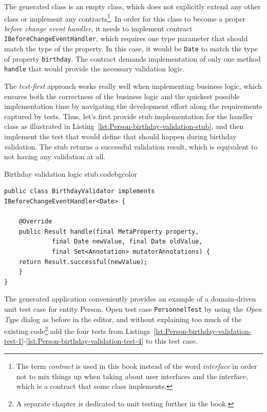   The generated class is an empty class, which does not explicitly extend any other class or implement any contracts\footnote{The term \emph{contract} is used in this book instead of the word \emph{interface} in order not to mix things up when taking about user interfaces and the interface, which is a contract that some class implements.}.
  In order for this class to become a proper \emph{before change event handler}, it needs to implement contract \texttt{IBeforeChangeEventHandler}, which requires one type parameter that should match the type of the property.
  In this case, it would be \texttt{Date} to match the type of property \texttt{birthday}.
  The contract demands implementation of only one method \texttt{handle} that would provide the necessary validation logic.
  
  The \emph{test-first} approach works really well when implementing business logic, which ensures both the correctness of the business logic and the quickest possible implementation time by navigating the development effort along the requirements captured by tests.
  Thus, let's first provide stub implementation for the handler class as illustrated in Listing~\ref{lst:Person-birthday-validation-stub}, and then implement the test that would define that should happen during birthday validation.  
  The stub returns a successful validation result, which is equivalent to not having any validation at all.
  
 \begin{code}{Birthday validation logic stub.}{\label{lst:Person-birthday-validation-stub}}{codebgcolor}
    \begin{lstlisting}
public class BirthdayValidator implements IBeforeChangeEventHandler<Date> {

    @Override
    public Result handle(final MetaProperty property, 
			 final Date newValue, final Date oldValue, 
			 final Set<Annotation> mutatorAnnotations) {
	return Result.successful(newValue);
    }
}
    \end{lstlisting}
  \end{code}
  
  The generated application conveniently provides an example of a domain-driven unit test case for entity Person.
  Open test case \texttt{PersonnelTest} by using the \emph{Open Type} dialog as before in the editor, and without explaining too much of the existing code\footnote{A separate chapter is dedicated to unit testing further in the book.} add the four tests from Listings~\ref{lst:Person-birthday-validation-test-1}-\ref{lst:Person-birthday-validation-test-4} to this test case.

